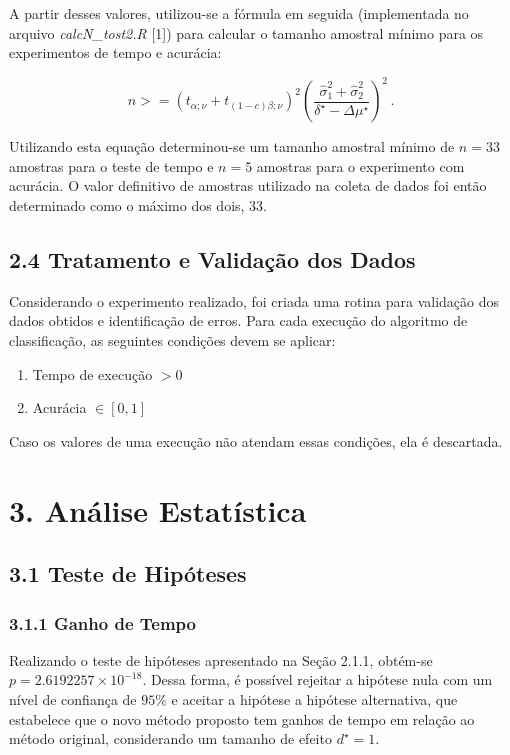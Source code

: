 \documentclass[]{article}
\providecommand{\tightlist}{%
  \setlength{\itemsep}{0pt}\setlength{\parskip}{0pt}}
\begin{document}
A partir desses valores, utilizou-se a fórmula em seguida (implementada
no arquivo \emph{calcN\_tost2.R} {[}1{]}) para calcular o tamanho
amostral mínimo para os experimentos de tempo e acurácia:

\[
n >= (t_{\alpha;\nu} + t_{(1-c)\beta;\nu})^2 
\left( \frac{\hat{\sigma}_1^2 + \hat{\sigma}_2^2}{\delta^{\star} - \Delta\mu^\star}\right)^2 \,.
\]

Utilizando esta equação determinou-se um tamanho amostral mínimo de
\(n = 33\) amostras para o teste de tempo e \(n = 5\) amostras para o
experimento com acurácia. O valor definitivo de amostras utilizado na
coleta de dados foi então determinado como o máximo dos dois, 33.

\subsection{2.4 Tratamento e Validação dos
Dados}\label{tratamento-e-validacao-dos-dados}

Considerando o experimento realizado, foi criada uma rotina para
validação dos dados obtidos e identificação de erros. Para cada execução
do algoritmo de classificação, as seguintes condições devem se aplicar:

\begin{enumerate}
\def\labelenumi{\arabic{enumi}.}
\tightlist
\item
  Tempo de execução \(> 0\)
\item
  Acurácia \(\in [0,1]\)
\end{enumerate}

Caso os valores de uma execução não atendam essas condições, ela é
descartada.

\section{3. Análise Estatística}\label{analise-estatistica}

\subsection{3.1 Teste de Hipóteses}\label{teste-de-hipoteses}

\subsubsection{3.1.1 Ganho de Tempo}\label{ganho-de-tempo}

Realizando o teste de hipóteses apresentado na Seção 2.1.1, obtém-se
\(p = 2.6192257\times 10^{-18}\). Dessa forma, é possível rejeitar a
hipótese nula com um nível de confiança de \(95\%\) e aceitar a hipótese
a hipótese alternativa, que estabelece que o novo método proposto tem
ganhos de tempo em relação ao método original, considerando um tamanho
de efeito \(d^\star = 1\).
\end{document}
